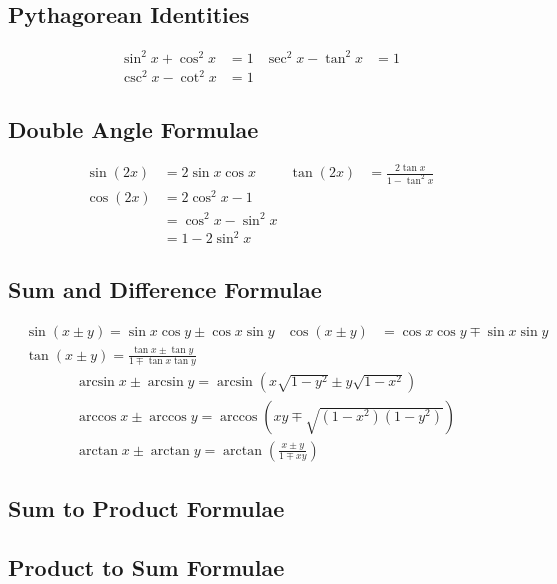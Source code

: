 \documentclass[12pt]{article}
\begin{document}
\subsection{Pythagorean Identities}

\begin{align*}
	\sin^2x + \cos^2x &= 1 &  \sec^2 x - \tan^2x &= 1 \\
	 \csc^2 x - \cot^2 x &= 1
\end{align*}

\subsection{Double Angle Formulae}
\begin{align*}
\sin{(2x)} &= 2\sin x\cos x & \tan{(2x)} &= \frac{2\tan x}{1 - \tan^2x} \\
\cos{(2x)} &= 2\cos^2x - 1 \\
&= \cos^2x - \sin^2x \\ &= 1 - 2\sin^2x
\end{align*}




\subsection{Sum and Difference Formulae}
\begin{align*}
&\sin{(x \pm y)} = \sin x\cos y \pm \cos x\sin y &
\cos{(x \pm y)} &= \cos x \cos y \mp \sin x \sin y \\
&\tan{(x \pm y)} = \frac{\tan x \pm \tan y}{1 \mp \tan x \tan y}
\end{align*}
\begin{align*}
&\arcsin x \pm \arcsin y = \arcsin{(x\sqrt{1 - y^2}\pm y\sqrt{1 - x^2})} \\ &\arccos x \pm \arccos y = \arccos{(xy \mp \sqrt{(1-x^2)(1-y^2)})} \\
&\arctan x \pm \arctan y = \arctan{(\frac{x\pm y}{1 \mp xy})}
\end{align*}

\subsection{Sum to Product Formulae}
\subsection{Product to Sum Formulae}
\end{document}
